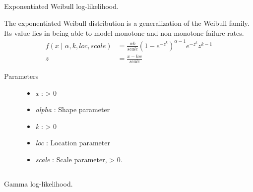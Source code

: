 \documentclass[]{jss}
\begin{document}
\subsection[exponentiated Weibull]{ }

Exponentiated Weibull log-likelihood.

The exponentiated Weibull distribution is a generalization of the Weibull
family. Its value lies in being able to model monotone and non-monotone
failure rates.
\begin{eqnarray*}
    f(x \mid \alpha,k,loc,scale)  & = \frac{\alpha k}{scale} (1-e^{-z^k})^{\alpha-1} e^{-z^k} z^{k-1} \\
    z & = \frac{x-loc}{scale}    
\end{eqnarray*}
\begin{description}
\item[Parameters] \leavevmode\begin{itemize}
\item {} 
\emph{x} : \textgreater{} 0

\item {} 
\emph{alpha} : Shape parameter

\item {} 
\emph{k} : \textgreater{} 0

\item {} 
\emph{loc} : Location parameter

\item {} 
\emph{scale} : Scale parameter, \textgreater{} 0.

\end{itemize}

\end{description}

\subsection[gamma]{ }

Gamma log-likelihood.
\end{document}
